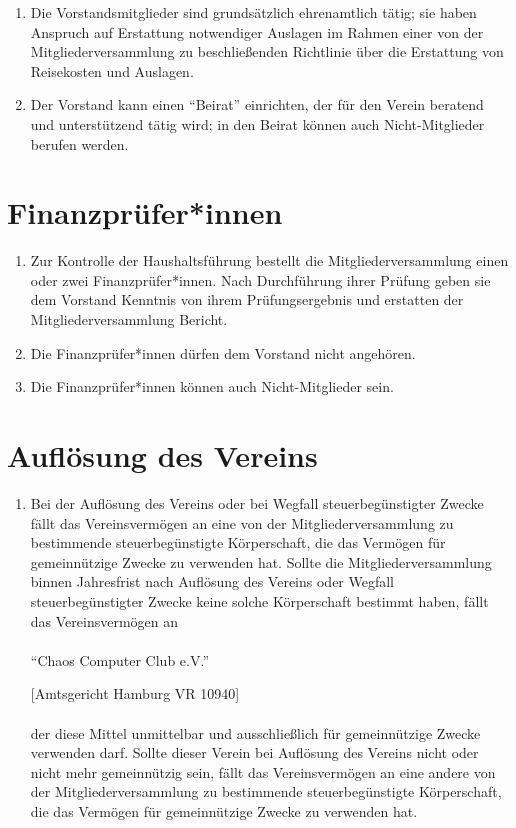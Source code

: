 \documentclass[a4paper]{article}
\begin{document}
\begin{enumerate}
	\item Die Vorstandsmitglieder sind grundsätzlich ehrenamtlich tätig; sie haben Anspruch auf Erstattung notwendiger Auslagen im Rahmen einer von der Mitgliederversammlung zu beschließenden Richtlinie über die Erstattung von Reisekosten und Auslagen. 
	
	\item Der Vorstand kann einen \enquote{Beirat} einrichten, der für den Verein beratend und unterstützend tätig wird; in den Beirat können auch Nicht-Mitglieder berufen werden. 

\end{enumerate}

\section{Finanzprüfer*innen}
\begin{enumerate}
	\item Zur Kontrolle der Haushaltsführung bestellt die Mitgliederversammlung einen oder zwei Finanzprüfer*innen. Nach Durchführung ihrer Prüfung geben sie dem Vorstand Kenntnis von ihrem Prüfungsergebnis und erstatten der Mitgliederversammlung Bericht.
	\item Die Finanzprüfer*innen dürfen dem Vorstand nicht angehören. 
	\item Die Finanzprüfer*innen können auch Nicht-Mitglieder sein.
\end{enumerate}

\filbreak
\section{Auflösung des Vereins}
\begin{enumerate}
	\item Bei der Auflösung des Vereins oder bei Wegfall steuerbegünstigter Zwecke fällt das Vereinsvermögen an eine von der Mitgliederversammlung zu bestimmende steuerbegünstigte Körperschaft, die das Vermögen für gemeinnützige Zwecke zu verwenden hat. Sollte die Mitgliederversammlung binnen Jahresfrist nach Auflösung des Vereins oder Wegfall steuerbegünstigter Zwecke keine solche Körperschaft bestimmt haben, fällt das Vereinsvermögen an
	 \\
	 \\
	\enquote{Chaos Computer Club e.V.}
	
	[Amtsgericht Hamburg VR 10940]
	\\
	\\
	der diese Mittel unmittelbar und ausschließlich für gemeinnützige Zwecke verwenden darf. Sollte dieser Verein bei Auflösung des Vereins nicht oder nicht mehr gemeinnützig sein, fällt das Vereinsvermögen an eine andere von der Mitgliederversammlung zu bestimmende steuerbegünstigte Körperschaft, die das Vermögen für gemeinnützige Zwecke zu verwenden hat.
\end{enumerate}
\end{document}
